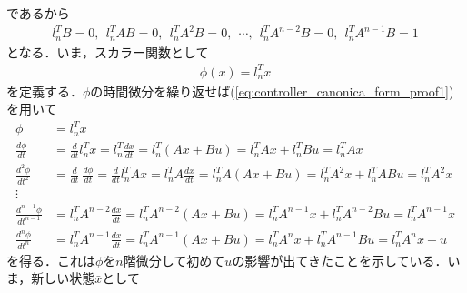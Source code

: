 であるから
\begin{align}
		 l_n^T B =0 
		 ,\ \ 
		 l_n^T A B =0
		 ,\ \ 
		 l_n^T A^2 B =0
		 ,\ \ 
		 \cdots 
		 ,\ \ 
		 l_n^T A^{n-2}B =0
		 ,\ \ 
		 l_n^T A^{n-1}B =1
\label{eq:controller_canonica_form_proof1}
\end{align}
となる．いま，スカラー関数として
\begin{align}
	\phi(x) = l_n^T x
\end{align}
を定義する．$\phi$の時間微分を繰り返せば(\ref{eq:controller_canonica_form_proof1})を用いて
\begin{align}
	\phi &= l_n^T x
\nonumber\\
	\frac{d \phi}{dt} 
	& = \frac{d}{dt} l_n^T x 
	= l_n^T \frac{dx}{dt} 
	= l_n^T (Ax+Bu) 
	= l_n^T A x + l_n^T Bu 
	= l_n^T A x 
\nonumber\\
	\frac{d^2 \phi}{dt^2} 
	& = \frac{d}{dt} \ \frac{d \phi}{dt}
	= \frac{d}{dt} l_n^T A x 
	= l_n^T A \frac{dx}{dt} 
	= l_n^T A (Ax+Bu) 
	= l_n^T A^2 x + l_n^T A Bu 
	= l_n^T A^2 x 
\nonumber\\
	\vdots
\\
	\frac{d^{n-1} \phi}{dt^{n-1}} 
	& = l_n^T A^{n-2} \frac{dx}{dt} 
	= l_n^T A^{n-2} (Ax+Bu) 
	= l_n^T A^{n-1} x + l_n^T A^{n-2} Bu 
	= l_n^T A^{n-1} x 
\nonumber\\
	\frac{d^{n} \phi}{dt^{n}} 
	& = l_n^T A^{n-1} \frac{dx}{dt} 
	= l_n^T A^{n-1} (Ax+Bu) 
	= l_n^T A^{n} x + l_n^T A^{n-1} Bu 
	= l_n^T A^{n} x + u
\nonumber
\end{align}
を得る．これは$\phi$を$n$階微分して初めて$u$の影響が出てきたことを示している．いま，新しい状態$\bar{x}$として
